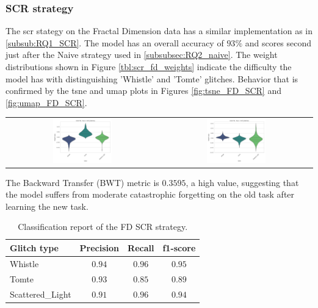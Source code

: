 \subsubsection{SCR strategy}
\label{subsubsec:RQ2_scr}
The \acrshort{scr} stategy on the Fractal Dimension data has a similar implementation as in \ref{subsub:RQ1_SCR}. The model has an overall accuracy of $93\%$ and scores second just after the Naive strategy used in \ref{subsubsec:RQ2_naive}. 
The weight distributions shown in Figure \ref{tbl:scr_fd_weights} indicate the difficulty the model has with distinguishing 'Whistle' and 'Tomte' glitches. Behavior that is confirmed by the \acrshort{tsne} and \acrshort{umap} plots in Figures \ref{fig:tsne_FD_SCR} and \ref{fig:umap_FD_SCR}. 
\begin{center}
\begin{tabular}{cc}
\includegraphics[width=0.4\textwidth]{Images/SCR_MultiView_exp_0.png} & \includegraphics[width=0.4\textwidth]{Images/SCR_MultiView_exp_2.png} \\
\end{tabular}
\label{tbl:scr_fd_weights}
\end{center}
The Backward Transfer (BWT) metric is $0.3595$, a high value, suggesting that the model suffers from moderate catastrophic forgetting on the old task after learning the new task.  

\begin{table}[ht]
\centering
    \begin{tabular}{|l|c c c|}
    \hline
    \textbf{Glitch type} & \textbf{Precision} & \textbf{Recall} & \textbf{f1-score} \\ \hline
    Whistle & $0.94$ & $0.96$ & $0.95$ \\
    Tomte & $0.93$ & $0.85$ & $0.89$ \\
    Scattered\_Light & $0.91$ & $0.96$ & $0.94$ \\
    \hline
    \end{tabular}
    \caption{Classification report of the FD SCR strategy.}
    \label{tbl:RQ2_class_report_FD_SCR}
\end{table}

